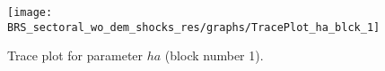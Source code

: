 \begin{figure}[H]
\centering
  \texttt{[image: BRS\_sectoral\_wo\_dem\_shocks\_res/graphs/TracePlot\_ha\_blck\_1]}\\
    \caption{Trace plot for parameter ${ha}$ (block number 1).}
\end{figure}
